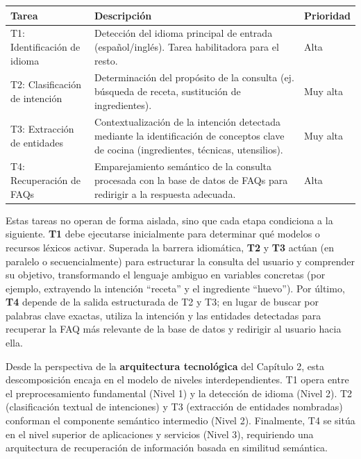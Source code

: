 \documentclass[11pt,a4paper,twoside]{article}
\theoremstyle{definition}
\numberwithin{equation}{section}
\begin{document}
\begin{table}[H]
	\centering
	\begin{tabular}{l p{7.5cm} l} %
		\toprule
		\textbf{Tarea} & \textbf{Descripción} & \textbf{Prioridad} \\
		\midrule
		T1: Identificación de idioma 
		& Detección del idioma principal de entrada (español/inglés). Tarea habilitadora para el resto. 
		& Alta \\ \addlinespace
		
		T2: Clasificación de intención 
		& Determinación del propósito de la consulta (ej. búsqueda de receta, sustitución de ingredientes).
		& Muy alta \\ \addlinespace
		
		T3: Extracción de entidades 
		& Contextualización de la intención detectada mediante la identificación de conceptos clave de cocina (ingredientes, técnicas, utensilios).
		& Muy alta \\ \addlinespace
		
		T4: Recuperación de FAQs  
		& Emparejamiento semántico de la consulta procesada con la base de datos de FAQs para redirigir a la respuesta adecuada.
		& Alta \\
		\bottomrule
	\end{tabular}
\end{table}

Estas tareas no operan de forma aislada, sino que cada etapa condiciona a la siguiente. \textbf{T1} debe ejecutarse inicialmente para determinar qué modelos o recursos léxicos activar. Superada la barrera idiomática, \textbf{T2} y \textbf{T3} actúan (en paralelo o secuencialmente) para estructurar la consulta del usuario y comprender su objetivo, transformando el lenguaje ambiguo en variables concretas (por ejemplo, extrayendo la intención ``receta'' y el ingrediente ``huevo''). Por último, \textbf{T4} depende de la salida estructurada de T2 y T3; en lugar de buscar por palabras clave exactas, utiliza la intención y las entidades detectadas para recuperar la FAQ más relevante de la base de datos y redirigir al usuario hacia ella.

Desde la perspectiva de la \textbf{arquitectura tecnológica} del Capítulo 2, esta descomposición encaja en el modelo de niveles interdependientes. T1 opera entre el preprocesamiento fundamental (Nivel 1) y la detección de idioma (Nivel 2). T2 (clasificación textual de intenciones) y T3 (extracción de entidades nombradas) conforman el componente semántico intermedio (Nivel 2). Finalmente, T4 se sitúa en el nivel superior de aplicaciones y servicios (Nivel 3), requiriendo una arquitectura de recuperación de información basada en similitud semántica. 
\end{document}
